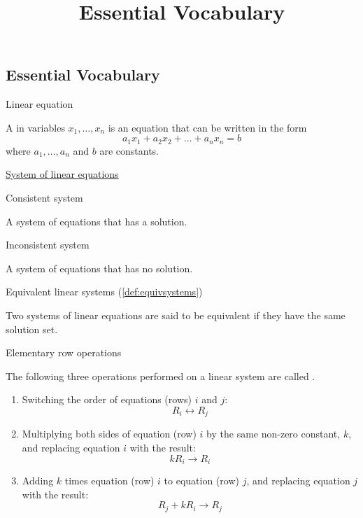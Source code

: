\documentclass{ximera}
\title{Essential Vocabulary} \license{CC BY-NC-SA 4.0}
\begin{document}
\begin{abstract}
\end{abstract}
\maketitle


\begin{onlineOnly}
\section*{Essential Vocabulary}
\end{onlineOnly}

Linear equation
\begin{expandable}
    A  in variables $x_1, \ldots, x_n$ is an equation that can be written in the form
$$a_1x_1+a_2x_2+\ldots +a_nx_n=b$$
where $a_1,\ldots ,a_n$ and $b$ are constants.
\end{expandable}

\href{https://ximera.osu.edu/oerlinalg/LinearAlgebra/SYS-0010/main}{System of linear equations}

Consistent system
\begin{expandable}
    A system of equations that has a solution.
\end{expandable}

Inconsistent system
\begin{expandable}
    A system of equations that has no solution.
\end{expandable}

Equivalent linear systems (\ref{def:equivsystems})
\begin{expandable}
    Two systems of linear equations are said to be equivalent if they have the same solution set.
\end{expandable}

\begin{blankBox}
Elementary row operations
\begin{expandable}
    The following three operations performed on a linear system are called .
\begin{enumerate}
\item Switching the order of equations (rows) $i$ and $j$:
$$R_i\leftrightarrow R_j$$
\item Multiplying both sides of equation (row) $i$ by the same non-zero constant, $k$, and replacing equation $i$ with the result:
$$kR_i\rightarrow R_i$$
\item Adding $k$ times equation (row) $i$ to equation (row) $j$, and replacing equation $j$ with the result:
$$R_j+kR_i\rightarrow R_j$$
\end{enumerate}
\end{expandable}
\end{blankBox}
\end{document}
